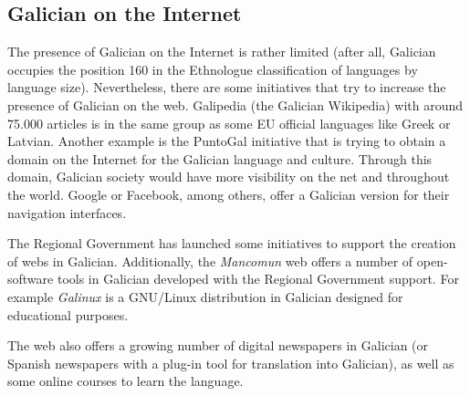 \begin{multicols}{2}
\subsection{Galician on the Internet}

   The presence of Galician on the Internet is rather limited (after all, Galician occupies the position 160 in the Ethnologue \cite{GAL-Nota16} classification of languages by language size). Nevertheless, there are some initiatives that try to increase the presence of Galician on the web. Galipedia \cite{GAL-Nota17} (the Galician Wikipedia) with around 75.000 articles is in the same group as some EU official languages like Greek or Latvian.  Another example is the PuntoGal \cite{GAL-Nota18} initiative that is trying to obtain a domain on the Internet for the Galician language and culture. Through this domain, Galician society would have more visibility on the net and throughout the world.  Google or Facebook, among others, offer a Galician version for their navigation interfaces.

The Regional Government has launched some initiatives to support the creation of webs in Galician. Additionally, the \textit{Mancomun} \cite{GAL-Nota19} web offers a number of open-software tools in Galician developed with the Regional Government support. For example \textit{Galinux} \cite{GAL-Nota20} is a GNU/Linux distribution in Galician designed for educational purposes.


The web also offers a growing number of digital newspapers in Galician (or Spanish newspapers with a plug-in tool for translation into Galician), as well as some online courses to learn the language. 
 

\end{multicols}

\clearpage



